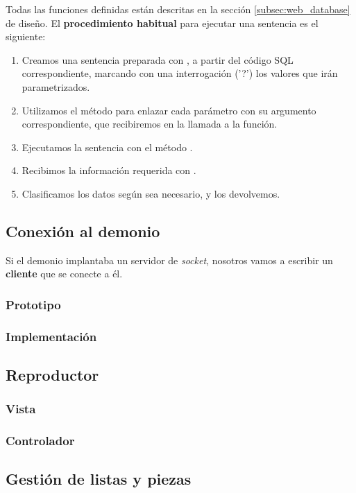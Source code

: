 Todas las funciones definidas están descritas en la sección \ref{subsec:web_database} de diseño. El \textbf{procedimiento habitual} para ejecutar una sentencia es el siguiente:

\begin{enumerate}
	\item Creamos una sentencia preparada con , a partir del código SQL correspondiente, marcando con una interrogación ('?') los valores que irán parametrizados.
	\item Utilizamos el método  para enlazar cada parámetro con su argumento correspondiente, que recibiremos en la llamada a la función.
	\item Ejecutamos la sentencia con el método .
	\item Recibimos la información requerida con .
	\item Clasificamos los datos según sea necesario, y los devolvemos.
\end{enumerate}

\subsection{Conexión al demonio}

Si el demonio implantaba un servidor de \textit{socket}, nosotros vamos a escribir un \textbf{cliente} que se conecte a él.

\subsubsection{Prototipo}
\subsubsection{Implementación}

\subsection{Reproductor}
\subsubsection{Vista}
\subsubsection{Controlador}

\subsection{Gestión de listas y piezas}
